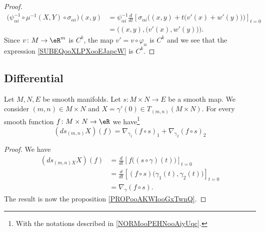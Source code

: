 \begin{proof}
\begin{subequations}
		\begin{align}
			\big( \psi_{\alpha i}^{-1}\circ\mu^{-1}(X,Y)\circ \sigma_{\alpha i} \big)(x,y) & =\psi_{\alpha i}^{-1}\frac{d}{dt} \left[ \sigma_{\alpha i}\Big( (x,y)+t\big( v'(x)+w'(y) \big) \Big)  \right]_{t=0} \\
			                                                                               & =\Big( (x,y),\big( v'(x),w'(y) \big) \Big).		\label{SUBEQooXLPXooEJapcW}
		\end{align}
	\end{subequations}
	Since \(v \colon M\to \eR^m  \) is \( C^k\), the map \( v'=v\circ\varphi_{\alpha}\) is \( C^k\) and we see that the expression \eqref{SUBEQooXLPXooEJapcW} is \( C^k\).
\end{proof}

\subsection{Differential}

\begin{proposition}	\label{PROPooFNVKooVxPulA}
	Let \( M,N,E\) be smooth manifolds. Let \(s \colon M\times N\to E  \) be a smooth map. We consider \( (m,n)\in M\times N\) and \( X=\gamma'(0)\in T_{(m,n)}(M\times N)\). For every smooth function \(f \colon M\times N\to \eR  \) we have\footnote{With the notations described in \ref{NORMooPEHNooAiyUqc}.}
	\begin{equation}
		(ds_{(m,n)}X)(f)=\nabla_{\gamma_1}(f\circ s)_1+\nabla_{\gamma_2}(f\circ s)_2
	\end{equation}
\end{proposition}

\begin{proof}
	We have
	\begin{subequations}
		\begin{align}
			(ds_{(m,n)X}X)(f) & =\frac{d}{dt} \left[ f\big( (s\circ \gamma)(t) \big)  \right]_{t=0}                  \\
			                  & = \frac{d}{dt} \left[   (f\circ s)\big( \gamma_1(t),\gamma_2(t) \big)  \right]_{t=0} \\
			                  & =\nabla_{\gamma}(f\circ s).
		\end{align}
	\end{subequations}
	The result is now the proposition \ref{PROPooAKWIooGxTwnQ}.
\end{proof}

